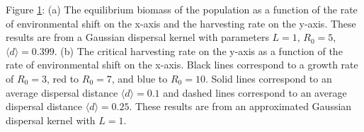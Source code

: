\documentclass[12pt,english]{article}
\begin{document}
\begin{spacing}{1.9}
\begin{flushleft}
\begin{figure}[htbp]
\begin{subfigure}{3in}
\end{subfigure}
\caption{
}
\label{baseline}
\end{figure}

\pagebreak

Figure \ref{baseline}: (a) The equilibrium biomass of the population as a function of the rate of environmental shift on the x-axis and the harvesting rate on the y-axis. These results are from a Gaussian dispersal kernel with parameters $L=1$, $R_0=5$, $\langle d \rangle = 0.399$.  (b) The critical harvesting rate on the y-axis as a function of the rate of environmental shift on the x-axis.  Black lines correspond to a growth rate of $R_0=3$, red to $R_0=7$, and blue to $R_0=10$.  Solid lines correspond to an average dispersal distance $\langle d \rangle =0.1$ and dashed lines correspond to an average dispersal distance $\langle d \rangle =0.25$.  These results are from an approximated Gaussian dispersal kernel with $L=1$.

\pagebreak


\end{flushleft}
\end{spacing}
\end{document}
